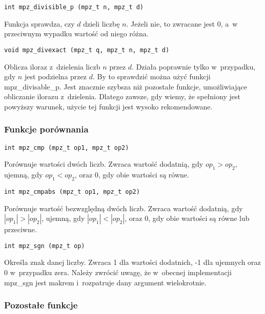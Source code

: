 \begin{lstlisting}
int mpz_divisible_p (mpz_t n, mpz_t d)
\end{lstlisting}

Funkcja sprawdza, czy $d$ dzieli liczbę $n$. Jeżeli nie, to zwracane jest $0$, a~w przeciwnym wypadku wartość od niego różna.

\begin{lstlisting}
void mpz_divexact (mpz_t q, mpz_t n, mpz_t d)
\end{lstlisting}

Oblicza iloraz z~dzielenia liczb $n$ przez $d$. Działa poprawnie tylko w~przypadku, gdy $n$ jest podzielna przez $d$. By to sprawdzić można użyć funkcji mpz\_divisable\_p. Jest znacznie szybsza niż pozostałe funkcje, umożliwiające obliczanie ilorazu z~dzielenia. Dlatego zawsze, gdy wiemy, że spełniony jest powyższy warunek, użycie tej funkcji jest wysoko rekomendowane.

\subsubsection{Funkcje porównania}

\begin{lstlisting}
int mpz_cmp (mpz_t op1, mpz_t op2)
\end{lstlisting}

Porównuje wartości dwóch liczb. Zwraca wartość dodatnią, gdy $op_1>op_2$, ujemną, gdy $op_1<op_2$, oraz $0$, gdy obie wartości są równe.

\begin{lstlisting}
int mpz_cmpabs (mpz_t op1, mpz_t op2)
\end{lstlisting}

Porównuje wartość bezwzględną dwóch liczb. Zwraca wartość dodatnią, gdy $|op_1|>|op_2|$, ujemną, gdy $|op_1|<|op_2|$, oraz $0$, gdy obie wartości są równe lub przeciwne.

\begin{lstlisting}
int mpz_sgn (mpz_t op)
\end{lstlisting}

Określa znak danej liczby. Zwraca 1 dla wartości dodatnich, -1 dla ujemnych oraz $0$ w~przypadku zera. Należy zwrócić uwagę, że w~obecnej implementacji mpz\_sgn jest makrem i~rozpatruje dany argument wielokrotnie.

\subsubsection{Pozostałe funkcje}

